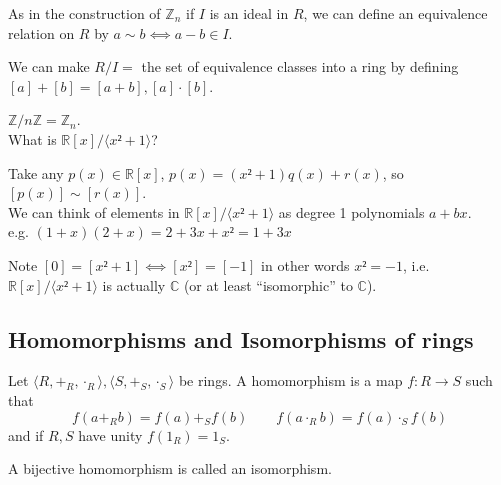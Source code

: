 \documentclass[english]{lbscript}
\begin{document}
As in the construction of \(ℤ_{n}\) if \(I \) is an ideal in \(R\), we can define an equivalence relation on \(R\) by \(a\sim b ⟺ a-b∈I\).

We can make \(R/I=\) the set of equivalence classes into a ring by defining \([a]+[b]=[a+b], [a]⋅[b]\).

\begin{example}{}{}
  \(ℤ / nℤ = ℤ_{n}\).\\

  What is \(ℝ[x] / ⟨x²+1⟩\)?

  Take any \(p(x)∈ℝ[x]\), \(p(x)=(x²+1)q(x) + r(x)\), so \([p(x)]\sim [r(x)]\).\\
  We can think of elements in \(ℝ[x] / ⟨x²+1⟩\) as degree 1 polynomials \(a+bx\).\\
  e.g. \((1+x)(2+x)=2+3x+x²=1+3x\)

  Note \([0]=[x²+1]⟺[x²]=[-1]\) in other words \(x²=-1\), i.e. \(ℝ[x] / ⟨x²+1⟩\) is actually \(ℂ\) (or at least \enquote{isomorphic} to \(ℂ\)).
\end{example}


\subsection{Homomorphisms and Isomorphisms of rings}
\label{sec:homom-isom-rings}

Let \(⟨R,+_{R},⋅_{R}⟩, ⟨S,+_{S}, ⋅_{S} ⟩\) be rings. A homomorphism is a map \(f:R→S\) such that
\begin{equation}
  \label{eq:108}
  f(a+_{R}b) = f(a) +_{S} f(b)\quad \quad f(a⋅_{R}b)=f(a)⋅_{S}f(b)
\end{equation}
and if \(R,S\) have unity \(f(1_{R})=1_{S}\).

A bijective homomorphism is called an isomorphism.
\end{document}
